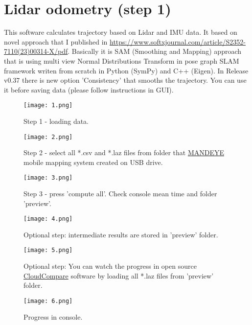 \chapter{Lidar odometry (step 1)}
This software calculates trajectory based on Lidar and IMU data.
It based on novel approach that I published in \url{https://www.softxjournal.com/article/S2352-7110(23)00314-X/pdf}.
Basically it is SAM (Smoothing and Mapping) approach that is using multi view Normal Distributions Transform in pose graph SLAM framework writen from scratch in Python (SymPy) and C++ (Eigen).
In Release v0.37 there is new option 'Consistency' that smooths the trajectory.
You can use it before saving data (please follow instructions in GUI).  
 

\begin{figure}
	\centering
	\texttt{[image: 1.png]}
	\caption{Step 1 - loading data.}
	\label{fig:1}
\end{figure}

\begin{figure}
	\centering
	\texttt{[image: 2.png]}
	\caption{Step 2 - select all *.csv and *.laz files from folder that \href{https://github.com/JanuszBedkowski/mandeye_controller/blob/main/doc/manual/manual_v0_1/mandeye_dev_manual_v0_1.pdf}{MANDEYE} mobile mapping system created on USB drive.}
	\label{fig:2}
\end{figure}

\begin{figure}
	\centering
	\texttt{[image: 3.png]}
	\caption{Step 3 - press 'compute all'. Check console mean time and folder 'preview'.}
	\label{fig:3}
\end{figure}

\begin{figure}
	\centering
	\texttt{[image: 4.png]}
	\caption{Optional step: intermediate results are stored in 'preview' folder.}
	\label{fig:4}
\end{figure}

\begin{figure}
	\centering
	\texttt{[image: 5.png]}
	\caption{Optional step: You can watch the progress in open source \href{https://www.cloudcompare.org/}{CloudCompare} software by loading all *.laz files from 'preview' folder.}
	\label{fig:5}
\end{figure}

\begin{figure}
	\centering
	\texttt{[image: 6.png]}
	\caption{Progress in console.}
	\label{fig:6}
\end{figure}

